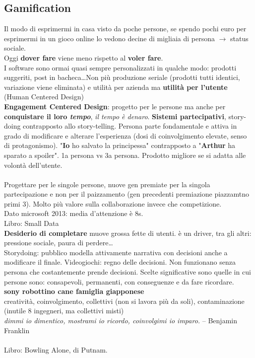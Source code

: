 \documentclass[10pt]{article}
\begin{document}
\subsection{Gamification}
Il modo di esprimermi in casa visto da poche persone, se spendo pochi euro per esprimermi in un gioco online lo vedono decine di migliaia di persona $\rightarrow$ status sociale.\\
Oggi \textbf{dover fare} viene meno rispetto al \textbf{voler fare}.\\
I software sono ormai quasi sempre personalizzati in qualche modo: prodotti suggeriti, post in bacheca\ldots Non più produzione seriale (prodotti tutti identici, variazione viene eliminata) e utilità per azienda ma \textbf{utilità per l'utente} (Human Centered Design)\\
\textbf{Engagement Centered Design}: progetto per le persone ma anche per \textbf{conquistare il loro \textit{tempo}}, \textit{il tempo è denaro}. \textbf{Sistemi partecipativi}, story-doing contrapposto allo story-telling. Persona parte fondamentale e attiva in grado di modificare e alterare l'esperienza (dosi di coinvolgimento elevate, senso di protagonismo). "\textbf{Io} ho salvato la principessa" contrapposto a "\textbf{Arthur} ha sparato a spoiler". 1a persona vs 3a persona. Prodotto migliore se si adatta alle volontà dell'utente.\\\\
Progettare per le singole persone, nuove gen premiate per la singola partecipazione e non per il paizzamento (gen precedenti premiazione piazzamtno primi 3). Molto più valore sulla collaborazione invece che competizione.\\
Dato microsoft 2013: media d'attenzione è 8s.\\
Libro: Small Data\\
\textbf{Desiderio di completare} muove grossa fette di utenti. è un driver, tra gli altri: pressione sociale, paura di perdere\ldots\\
Storydoing: pubblico modella attivamente narrativa con decisioni anche a modificare il finale. Videogiochi: regno delle decisioni. Non funzionano senza persona che costantemente prende decisioni. Scelte significative sono quelle in cui persone sono: consapevoli, permanenti, con conseguenze e da fare ricordare.\\
\textbf{sony robottino cane famiglia giapponese}\\
creatività, coinvolgimento, collettivi (non si lavora più da soli), contaminazione (inutile 8 ingegneri, ma collettivi misti)\\
\textit{dimmi io dimentico, mostrami io ricordo, coinvolgimi io imparo.} -- Benjamin Franklin\\\\
Libro: Bowling Alone, di Putnam.
\end{document}
